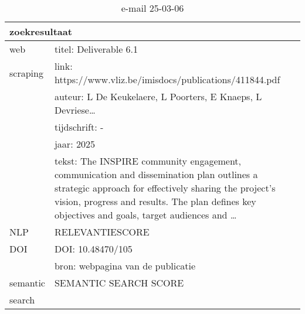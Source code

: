 \begin{table}[h!]
    \caption{e-mail 25-03-06}
    \centering
    \begin{tabularx}{\textwidth}{|p{4cm}|X|} 
        \hline
        \multicolumn{2}{|X|}{\textbf{zoekresultaat}} \\
        \hline
        web &titel: Deliverable 6.1\\
        scraping&link: https://www.vliz.be/imisdocs/publications/411844.pdf\\
        &auteur: L De Keukelaere, L Poorters, E Knaeps, L Devriese…\\
        &tijdschrift: -\\
        &jaar: 2025\\
        &tekst: The INSPIRE community engagement, communication and dissemination plan outlines a strategic approach for effectively sharing the project’s vision, progress and results. The plan defines key objectives and goals, target audiences and …\\
        \hline
        NLP&RELEVANTIESCORE\\
        \hline
        DOI&DOI: 10.48470/105\\
        &bron: webpagina van de publicatie\\
        \hline
        semantic&SEMANTIC SEARCH SCORE\\
        search&\\
        \hline
    \end{tabularx}
    \label{table:email20250306}
\end{table}
